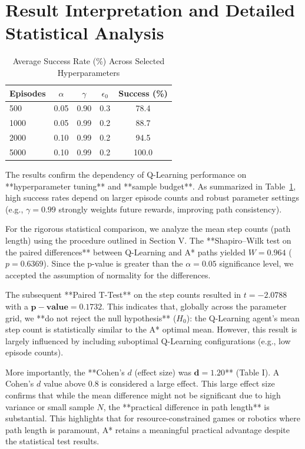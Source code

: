 \documentclass[conference]{IEEEtran}
\begin{document}
	\section{Result Interpretation and Detailed Statistical Analysis}
	
	\begin{table}[t]\caption{Average Success Rate (\%) Across Selected Hyperparameters}\centering\begin{tabular}{lcccc}\toprule
			Episodes & $\alpha$ & $\gamma$ & $\epsilon_0$ & Success (\%) \\\midrule
			500 & 0.05 & 0.90 & 0.3 & 78.4 \\
			1000 & 0.05 & 0.99 & 0.2 & 88.7 \\
			2000 & 0.10 & 0.99 & 0.2 & 94.5 \\
			5000 & 0.10 & 0.99 & 0.2 & 100.0 \\\bottomrule\end{tabular}\label{tab:hyperparams}\end{table}
	
	The results confirm the dependency of Q-Learning performance on **hyperparameter tuning** and **sample budget**. As summarized in Table~\ref{tab:hyperparams}, high success rates depend on larger episode counts and robust parameter settings (e.g., $\gamma=0.99$ strongly weights future rewards, improving path consistency).
	
	For the rigorous statistical comparison, we analyze the mean step counts (path length) using the procedure outlined in Section V. The **Shapiro–Wilk test on the paired differences** between Q-Learning and A* paths yielded $W=0.964$ ($p=0.6369$). Since the p-value is greater than the $\alpha=0.05$ significance level, we accepted the assumption of normality for the differences.
	
	The subsequent **Paired T-Test** on the step counts resulted in $t=-2.0788$ with a $\mathbf{p-value = 0.1732}$. This indicates that, globally across the parameter grid, we **do not reject the null hypothesis** ($H_0$): the Q-Learning agent's mean step count is statistically similar to the A* optimal mean. However, this result is largely influenced by including suboptimal Q-Learning configurations (e.g., low episode counts).
	
	More importantly, the **Cohen’s $d$ (effect size) was $\mathbf{d = 1.20}$** (Table I). A Cohen's $d$ value above $0.8$ is considered a large effect. This large effect size confirms that while the mean difference might not be significant due to high variance or small sample $N$, the **practical difference in path length** is substantial. This highlights that for resource-constrained games or robotics where path length is paramount, A* retains a meaningful practical advantage despite the statistical test results.
	
\end{document}
